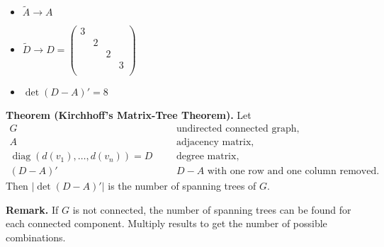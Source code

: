 \begin{itemize}
	\item $\tilde A \rightarrow A$
	\item $\tilde D \rightarrow D = 
		\begin{pmatrix}3 \\ & 2 \\ & & 2 \\ & & & 3 \\ \end{pmatrix}$
	\item $\det{(D-A)'} = 8$
\end{itemize}

\textbf{Theorem (Kirchhoff's Matrix-Tree Theorem).}
Let
\begin{align*}
G &&& \text{undirected connected graph,} \\
A &&& \text{adjacency matrix,} \\
\operatorname{diag}(d(v_1),\ldots,d(v_n)) = D &&& \text{degree matrix,} \\
(D-A)' &&& \text{$D-A$ with one row and one column removed.}
\end{align*}
Then $|\det{(D-A)'}|$ is the number of spanning trees of $G$.

\textbf{Remark.} If $G$ is not connected, the number of spanning trees can be
found for each connected component. Multiply results to get the number
of possible combinations.








